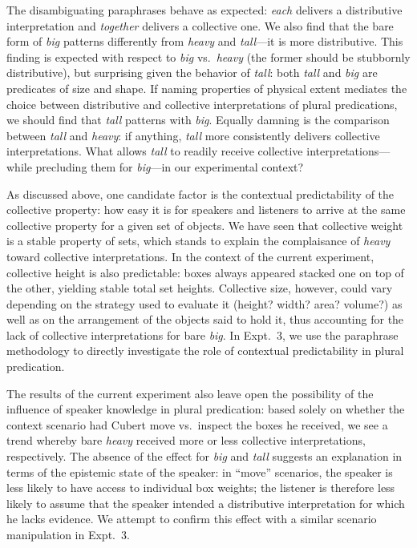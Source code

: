 \documentclass[linguex]{sp}
\begin{document}
The disambiguating paraphrases behave as expected: \emph{each} delivers a distributive interpretation and \emph{together} delivers a collective one. We also find that the bare form of \emph{big} patterns differently from \emph{heavy} and \emph{tall}---it is more distributive. This finding is expected with respect to \textit{big} vs.~\textit{heavy} (the former should be stubbornly distributive), but surprising given the behavior of \textit{tall}: both \emph{tall} and \emph{big} are predicates of size and shape. If naming properties of physical extent mediates the choice between distributive and collective interpretations of plural predications, we should find that \emph{tall} patterns with \emph{big}. Equally damning is the comparison between \emph{tall} and \emph{heavy}: if anything, \emph{tall} more consistently delivers collective interpretations. What allows \emph{tall} to readily receive collective interpretations---while precluding them for \emph{big}---in our experimental context? 

As discussed above, one candidate factor is the contextual predictability of the collective property: how easy it is for speakers and listeners to arrive at the same collective property for a given set of objects. We have seen that collective weight is a stable property of sets, which stands to explain the complaisance of \emph{heavy} toward collective interpretations. In the context of the current experiment, collective height is also predictable: boxes  always appeared stacked one on top of the other, yielding stable total set heights. Collective size, however, could vary depending on the strategy used to evaluate it (height? width? area? volume?) as well as on the arrangement of the objects said to hold it, thus accounting for the lack of collective interpretations for bare \emph{big}. In Expt.~3, we use the paraphrase methodology to directly investigate the role of contextual predictability in plural predication.

The results of the current experiment also leave open the possibility of the influence of speaker knowledge in plural predication: based solely on whether the context scenario had Cubert move vs.~inspect the boxes he received, we see a trend whereby bare \emph{heavy} received more or less collective interpretations, respectively. The absence of the effect for \emph{big} and \emph{tall} suggests an explanation in terms of the epistemic state of the speaker: in ``move'' scenarios, the speaker is less likely to have access to individual box weights; the listener is therefore less likely to assume that the speaker intended a distributive interpretation for which he lacks evidence. We attempt to confirm this effect with a similar scenario manipulation in Expt.~3.
\end{document}
